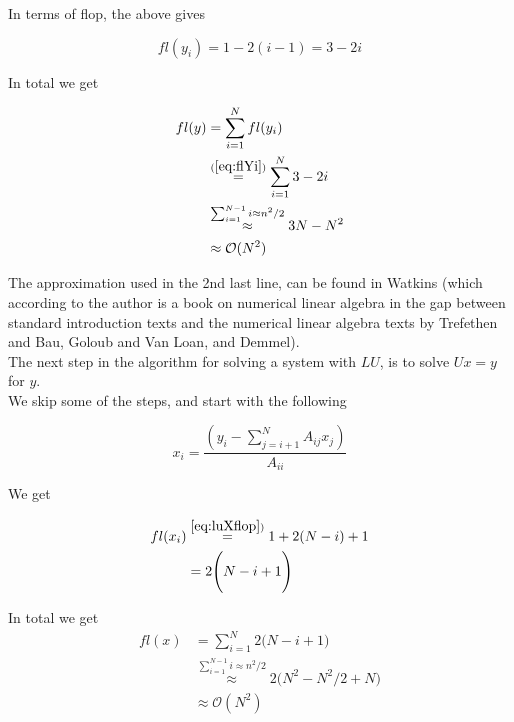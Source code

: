 \documentclass{article}
\begin{document}
In terms of flop, the above gives

\begin{equation}\label{eq:flYi}
fl(y_i) = 1 - 2(i - 1) = 3-2i
\end{equation}

In total we get

\begin{subequations}
	\begin{align}
	fl(y) &= \sum_{i=1}^{N} fl(y_i)\\
	&\stackrel{(\ref{eq:flYi})}{=} \sum_{i=1}^{N} 3 -2i\\
	&\stackrel{\sum_{i=1}^{N-1} i\approx n^2/2}{\approx}{3N - N^2  }\\
	&\approx \mathcal{O}(N^2)\label{eq:luForward}
	\end{align}
\end{subequations}

The approximation used in the 2nd last line, can be found in Watkins \cite{watkins} (which according to the author is a book on numerical linear algebra in the gap between standard introduction texts and the numerical linear algebra texts by Trefethen and Bau, Goloub and Van Loan, and Demmel).\\

The next step in the algorithm for solving a system with $LU$, is to solve $Ux = y$ for $y$.\\

We skip some of the steps, and start with the following

\begin{equation}\label{eq:luXflop}
x_i = \frac{(y_i - \sum_{j=i+1}^N A_{ij} x_j)}{A_{ii}}
\end{equation}

We get

\begin{align}
fl(x_i) & \stackrel{\ref{eq:luXflop})}{=} 1 + 2(N - i) + 1 \\
&= 2\Bigg(N-i + 1 \Bigg)
\end{align}

In total we get
\begin{subequations}
	\begin{align}
	fl(x) &= \sum_{i=1}^N 2\Bigg(N-i + 1 \Bigg)\\
	&\stackrel{\sum_{i=1}^{N-1} i\approx n^2/2}{\approx} 2 \Bigg( N^2 - N^2/2 + N\Bigg)\\
	&\approx \mathcal{O}(N^2)\label{eq:luBackwardOrder}
	\end{align}
\end{subequations}
\end{document}
